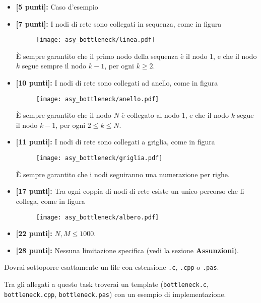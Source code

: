 \begin{itemize}[nolistsep, itemsep=2mm]
    \item \textbf{ [5 punti]:} Caso d'esempio
    \item \textbf{ [7 punti]:} I nodi di rete sono collegati in sequenza, come in figura
	    \begin{figure}[H]
		    \centering\texttt{[image: asy\_bottleneck/linea.pdf]}
	    \end{figure}
	    È sempre garantito che il primo nodo della sequenza è il nodo 1, e che il nodo $k$ segue sempre il nodo $k-1$, per ogni $k \ge 2$.
    \item \textbf{ [10 punti]:} I nodi di rete sono collegati ad anello, come in figura
	    \begin{figure}[H]
		    \centering\texttt{[image: asy\_bottleneck/anello.pdf]}
	    \end{figure}
	    È sempre garantito che il nodo $N$ è collegato al nodo 1, e che il nodo $k$ segue il nodo $k-1$, per ogni $2 \le k \le N$.
    \item \textbf{ [11 punti]:} I nodi di rete sono collegati a griglia, come in figura
	    \begin{figure}[H]
		    \centering\texttt{[image: asy\_bottleneck/griglia.pdf]}
	    \end{figure}
	    È sempre garantito che i nodi seguiranno una numerazione per righe.
    \item \textbf{ [17 punti]:} Tra ogni coppia di nodi di rete esiste un unico percorso che li collega, come in figura
	    \begin{figure}[H]
		    \centering\texttt{[image: asy\_bottleneck/albero.pdf]}
	    \end{figure}
    \item \textbf{ [22 punti]:} $N, M\leq 1000$.
    \item \textbf{ [28 punti]:} Nessuna limitazione specifica (vedi la sezione \textbf{Assunzioni}).
\end{itemize}

\newpage
\Implementation
Dovrai sottoporre esattamente un file con estensione \texttt{.c}, \texttt{.cpp} o \texttt{.pas}.

\begin{warning}
Tra gli allegati a questo task troverai un template (\texttt{bottleneck.c}, \texttt{bottleneck.cpp}, \texttt{bottleneck.pas}) con un esempio di implementazione.
\end{warning}

